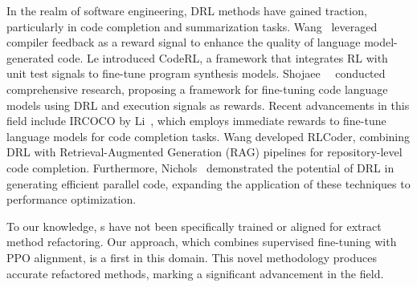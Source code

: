 In the realm of software engineering, DRL methods have gained traction, particularly in code completion and summarization tasks. Wang~\etal{}\cite{wang2022compilable} leveraged compiler feedback as a reward signal to enhance the quality of language model-generated code. Le\etal{}\cite{le2022coderl} introduced CodeRL, a framework that integrates RL with unit test signals to fine-tune program synthesis models. Shojaee~\etal{}~\cite{shojaee2023execution} conducted comprehensive research, proposing a framework for fine-tuning code language models using DRL and execution signals as rewards. Recent advancements in this field include IRCOCO by Li~\etal{}\cite{li2024ircoco}, which employs immediate rewards to fine-tune language models for code completion tasks. Wang\etal{}\cite{wang2024rlcoder} developed RLCoder, combining DRL with Retrieval-Augmented Generation (RAG) pipelines for repository-level code completion. Furthermore, Nichols\etal{}~\cite{nichols2024performance} demonstrated the potential of DRL in generating efficient parallel code, expanding the application of these techniques to performance optimization.

To our knowledge, \llm{}s have not been specifically trained or aligned for extract method refactoring. Our approach, which combines supervised fine-tuning with PPO alignment, is a first in this domain. This novel methodology produces accurate refactored methods, marking a significant advancement in the field.